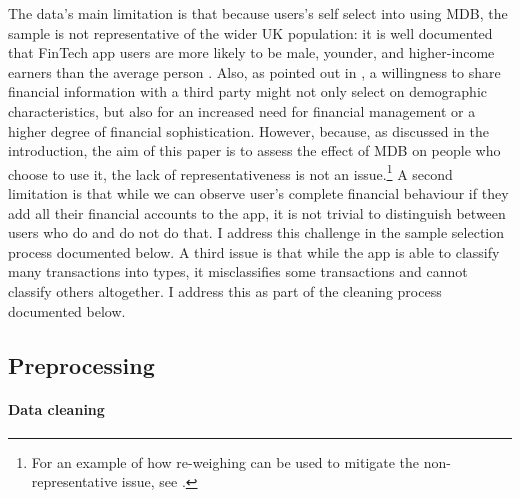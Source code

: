 The data's main limitation is that because users's self select into using MDB,
the sample is not representative of the wider UK population: it is well
documented that FinTech app users are more likely to be male, younder, and
higher-income earners than the average person \citet{carlin2019generational}.
Also, as pointed out in \citet{gelman2014harnessing}, a willingness to share
financial information with a third party might not only select on demographic
characteristics, but also for an increased need for financial management or a
higher degree of financial sophistication. However, because, as discussed in
the introduction, the aim of this paper is to assess the effect of MDB on
people who choose to use it, the lack of representativeness is not an
issue.\footnote{For an example of how re-weighing can be used to mitigate the
non-representative issue, see \citet{bourquin2020effects}.} A second limitation
is that while we can observe user's complete financial behaviour if they add
all their financial accounts to the app, it is not trivial to distinguish
between users who do and do not do that. I address this challenge in the sample
selection process documented below. A third issue is that while the app is able
to classify many transactions into types, it misclassifies some transactions
and cannot classify others altogether. I address this as part of the cleaning
process documented below.

\subsection{Preprocessing}%
\label{sub:preprocessing}

\paragraph{Data cleaning}%
\label{par:data_cleaning}

